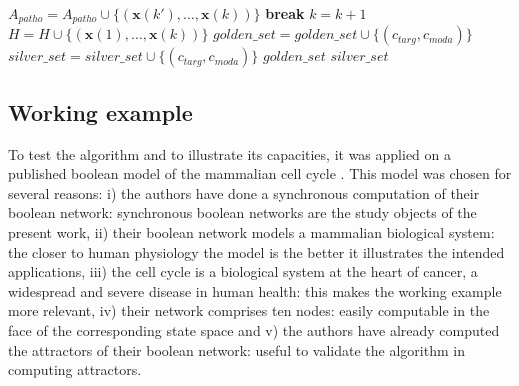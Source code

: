 \documentclass[oneside,a4paper,onecolumn,notitlepage,final]{article}
\begin{document}
\begin{algorithmic}[1]
                            \ENDIF
                        \ENDFOR
                    \ENDFOR
                        \STATE $A_{patho}=A_{patho}\cup \lbrace (\boldsymbol{x}(k'),\dots ,\boldsymbol{x}(k))\rbrace$
                        \STATE \textbf{break}
                    \ENDIF
                    \STATE $k=k+1$
                \ENDWHILE
                \STATE $H=H\cup \lbrace (\boldsymbol{x}(1),\dots ,\boldsymbol{x}(k))\rbrace$
            \ENDFOR
                    \STATE $golden\_set=golden\_set\cup \lbrace (c_{targ},c_{moda})\rbrace$
                \ELSE
                    \STATE $silver\_set=silver\_set\cup \lbrace (c_{targ},c_{moda})\rbrace$
                \ENDIF
            \ENDIF
        \ENDFOR
    \ENDFOR
\ENDFOR
\ENSURE $golden\_set$
\ENSURE $silver\_set$
\end{algorithmic}

\subsection{Working example}
To test the algorithm and to illustrate its capacities, it was applied on a published boolean model of the mammalian cell cycle \cite{faure2006dynamical}. This model was chosen for several reasons: i) the authors have done a synchronous computation of their boolean network: synchronous boolean networks are the study objects of the present work, ii) their boolean network models a mammalian biological system: the closer to human physiology the model is the better it illustrates the intended applications, iii) the cell cycle is a biological system at the heart of cancer, a widespread and severe disease in human health: this makes the working example more relevant, iv) their network comprises ten nodes: easily computable in the face of the corresponding state space and v) the authors have already computed the attractors of their boolean network: useful to validate the algorithm in computing attractors.
\end{document}

